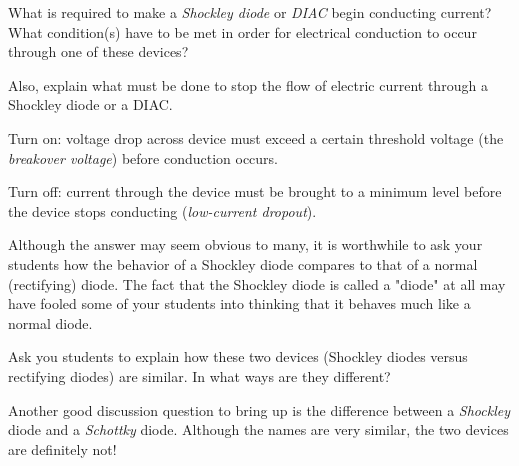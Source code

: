 

What is required to make a {\it Shockley diode} or {\it DIAC} begin conducting current?  What condition(s) have to be met in order for electrical conduction to occur through one of these devices?

Also, explain what must be done to stop the flow of electric current through a Shockley diode or a DIAC.







Turn on: voltage drop across device must exceed a certain threshold voltage (the {\it breakover voltage}) before conduction occurs.

\vskip 10pt

Turn off: current through the device must be brought to a minimum level before the device stops conducting ({\it low-current dropout}).







Although the answer may seem obvious to many, it is worthwhile to ask your students how the behavior of a Shockley diode compares to that of a normal (rectifying) diode.  The fact that the Shockley diode is called a "diode" at all may have fooled some of your students into thinking that it behaves much like a normal diode.

Ask you students to explain how these two devices (Shockley diodes versus rectifying diodes) are similar.  In what ways are they different?

Another good discussion question to bring up is the difference between a {\it Shockley} diode and a {\it Schottky} diode.  Although the names are very similar, the two devices are definitely not!




